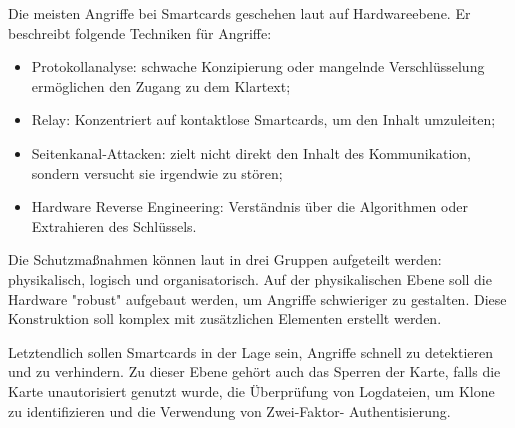Die meisten Angriffe bei Smartcards geschehen laut \cite{refmas:ASSS} auf Hardwareebene.
Er beschreibt folgende Techniken für Angriffe:

\begin{itemize}
    \item Protokollanalyse: schwache Konzipierung oder mangelnde Verschlüsselung ermöglichen den Zugang 
    zu dem Klartext; 
    \item Relay: Konzentriert auf kontaktlose Smartcards, um den Inhalt umzuleiten;
    \item Seitenkanal-Attacken: zielt nicht direkt den Inhalt des Kommunikation, sondern versucht sie
    irgendwie zu stören;
    \item Hardware Reverse Engineering: Verständnis über die Algorithmen oder Extrahieren des Schlüssels.
\end{itemize}


Die Schutzmaßnahmen können laut \cite{refmas:ASSS} in drei Gruppen aufgeteilt werden: physikalisch,
logisch und organisatorisch. Auf der physikalischen Ebene soll die Hardware "robust" aufgebaut werden,
um Angriffe schwieriger zu gestalten. Diese Konstruktion soll komplex mit zusätzlichen Elementen erstellt
werden. 


Letztendlich sollen Smartcards in der Lage sein, Angriffe schnell zu detektieren und zu verhindern.
Zu dieser Ebene gehört auch das Sperren der Karte, falls die Karte unautorisiert genutzt wurde, 
die Überprüfung von Logdateien, um Klone zu identifizieren und die Verwendung von Zwei-Faktor-
Authentisierung.
